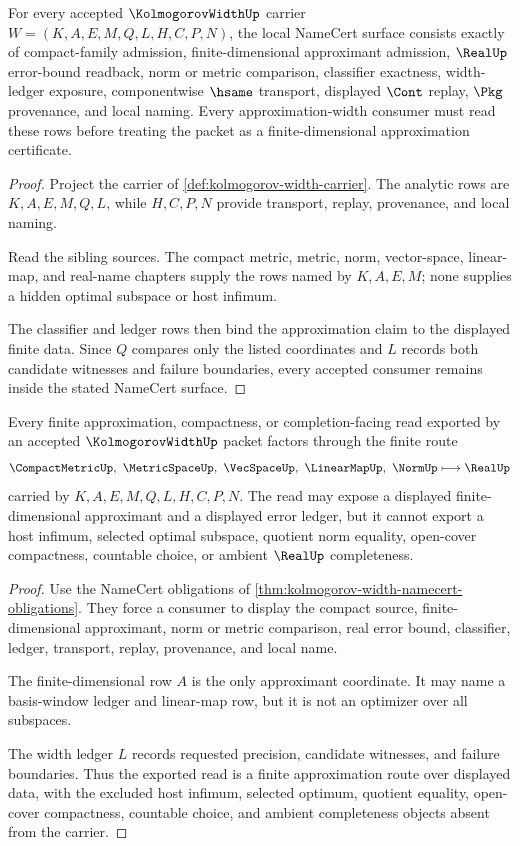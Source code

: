 \begin{theorem}
\label{thm:kolmogorov-width-namecert-obligations}
For every accepted $\KolmogorovWidthUp$ carrier $W=(K,A,E,M,Q,L,H,C,P,N)$, the local NameCert surface consists exactly of compact-family admission, finite-dimensional approximant admission, $\RealUp$ error-bound readback, norm or metric comparison, classifier exactness, width-ledger exposure, componentwise $\hsame$ transport, displayed $\Cont$ replay, $\Pkg$ provenance, and local naming. Every approximation-width consumer must read these rows before treating the packet as a finite-dimensional approximation certificate.
\end{theorem}
\begin{proof}
Project the carrier of \autoref{def:kolmogorov-width-carrier}. The analytic rows are $K,A,E,M,Q,L$, while $H,C,P,N$ provide transport, replay, provenance, and local naming.

Read the sibling sources. The compact metric, metric, norm, vector-space, linear-map, and real-name chapters supply the rows named by $K,A,E,M$; none supplies a hidden optimal subspace or host infimum.

The classifier and ledger rows then bind the approximation claim to the displayed finite data. Since $Q$ compares only the listed coordinates and $L$ records both candidate witnesses and failure boundaries, every accepted consumer remains inside the stated NameCert surface.
\end{proof}

\begin{theorem}
\label{thm:kolmogorov-width-finite-approximation-route}
Every finite approximation, compactness, or completion-facing read exported by an accepted $\KolmogorovWidthUp$ packet factors through the finite route
$$
\CompactMetricUp,\ \MetricSpaceUp,\ \VecSpaceUp,\ \LinearMapUp,\ \NormUp \longmapsto \RealUp
$$
carried by $K,A,E,M,Q,L,H,C,P,N$. The read may expose a displayed finite-dimensional approximant and a displayed error ledger, but it cannot export a host infimum, selected optimal subspace, quotient norm equality, open-cover compactness, countable choice, or ambient $\RealUp$ completeness.
\end{theorem}
\begin{proof}
Use the NameCert obligations of \autoref{thm:kolmogorov-width-namecert-obligations}. They force a consumer to display the compact source, finite-dimensional approximant, norm or metric comparison, real error bound, classifier, ledger, transport, replay, provenance, and local name.

The finite-dimensional row $A$ is the only approximant coordinate. It may name a basis-window ledger and linear-map row, but it is not an optimizer over all subspaces.

The width ledger $L$ records requested precision, candidate witnesses, and failure boundaries. Thus the exported read is a finite approximation route over displayed data, with the excluded host infimum, selected optimum, quotient equality, open-cover compactness, countable choice, and ambient completeness objects absent from the carrier.
\end{proof}


